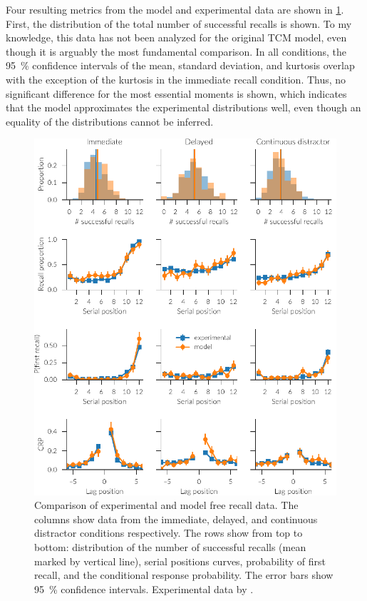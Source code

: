 Four resulting metrics from the model and experimental data are shown in \cref{fig:results-free}.
First, the distribution of the total number of successful recalls is shown.
To my knowledge, this data has not been analyzed for the original TCM model, even though it is arguably the most fundamental comparison.
In all conditions, the \SI{95}{\percent} confidence intervals of the mean, standard deviation, and kurtosis overlap with the exception of the kurtosis in the immediate recall condition.
Thus, no significant difference for the most essential moments is shown, which indicates that the model approximates the experimental distributions well, even though an equality of the distributions cannot be inferred.
\begin{figure}
    \centering
    \includegraphics{figures/results/free}
    \caption[Comparison of experimental and model free recall data.]{Comparison of experimental and model free recall data. The columns show data from the immediate, delayed, and continuous distractor conditions respectively. The rows show from top to bottom: distribution of the number of successful recalls (mean marked by vertical line), serial positions curves, probability of first recall, and the conditional response probability. The error bars show \SI{95}{\percent} confidence intervals. Experimental data by \textcite{Howard1999}.}\label{fig:results-free}
\end{figure}

